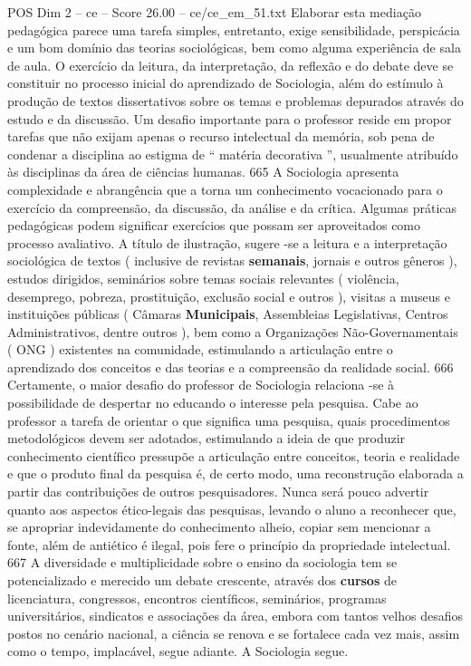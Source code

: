\begin{textsample}{POS Dim 2 – ce – Score 26.00 – ce/ce\_em\_51.txt}
Elaborar esta mediação pedagógica parece uma tarefa simples, entretanto, exige sensibilidade, perspicácia e um bom domínio das teorias sociológicas, bem como alguma experiência de sala de aula.
O exercício da leitura, da interpretação, da reflexão e do debate deve se constituir no processo inicial do aprendizado de Sociologia, além do estímulo à produção de textos dissertativos sobre os temas e problemas depurados através do estudo e da discussão.
Um desafio importante para o professor reside em propor tarefas que não exijam apenas o recurso intelectual da memória, sob pena de condenar a disciplina ao estigma de “ matéria decorativa ”, usualmente atribuído às disciplinas da área de ciências humanas. 665 A Sociologia apresenta complexidade e abrangência que a torna um conhecimento vocacionado para o exercício da compreensão, da discussão, da análise e da crítica.
Algumas práticas pedagógicas podem significar exercícios que possam ser aproveitados como processo avaliativo.
A título de ilustração, sugere -se a leitura e a interpretação sociológica de textos ( inclusive de revistas \textbf{semanais}, jornais e outros gêneros ), estudos dirigidos, seminários sobre temas sociais relevantes ( violência, desemprego, pobreza, prostituição, exclusão social e outros ), visitas a museus e instituições públicas ( Câmaras \textbf{Municipais}, Assembleias Legislativas, Centros Administrativos, dentre outros ), bem como a Organizações Não-Governamentais ( ONG ) existentes na comunidade, estimulando a articulação entre o aprendizado dos conceitos e das teorias e a compreensão da realidade social. 666 Certamente, o maior desafio do professor de Sociologia relaciona -se à possibilidade de despertar no educando o interesse pela pesquisa.
Cabe ao professor a tarefa de orientar o que significa uma pesquisa, quais procedimentos metodológicos devem ser adotados, estimulando a ideia de que produzir conhecimento científico pressupõe a articulação entre conceitos, teoria e realidade e que o produto final da pesquisa é, de certo modo, uma reconstrução elaborada a partir das contribuições de outros pesquisadores.
Nunca será pouco advertir quanto aos aspectos ético-legais das pesquisas, levando o aluno a reconhecer que, se apropriar indevidamente do conhecimento alheio, copiar sem mencionar a fonte, além de antiético é ilegal, pois fere o princípio da propriedade intelectual. 667 A diversidade e multiplicidade sobre o ensino da sociologia tem se potencializado e merecido um debate crescente, através dos \textbf{cursos} de licenciatura, congressos, encontros científicos, seminários, programas universitários, sindicatos e associações da área, embora com tantos velhos desafios postos no cenário nacional, a ciência se renova e se fortalece cada vez mais, assim como o tempo, implacável, segue adiante.
A Sociologia segue.

\end{textsample}
